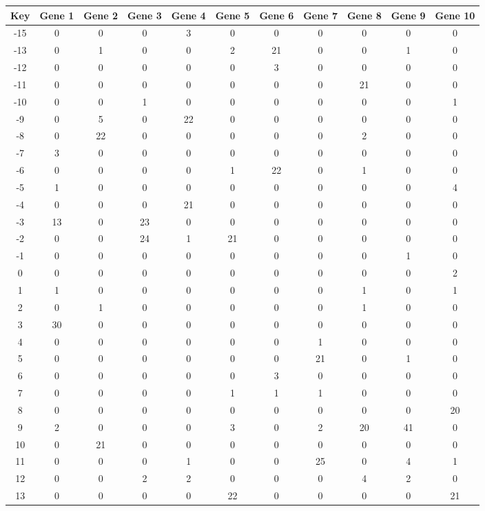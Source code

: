\begin{tabular}{|c|c|c|c|c|c|c|c|c|c|c|}
\hline
Key & Gene 1 & Gene 2 & Gene 3 & Gene 4 & Gene 5 & Gene 6 & Gene 7 & Gene 8 & Gene 9 & Gene 10 \\
\hline
-15 & 0 & 0 & 0 & 3 & 0 & 0 & 0 & 0 & 0 & 0 \\
-13 & 0 & 1 & 0 & 0 & 2 & 21 & 0 & 0 & 1 & 0 \\
-12 & 0 & 0 & 0 & 0 & 0 & 3 & 0 & 0 & 0 & 0 \\
-11 & 0 & 0 & 0 & 0 & 0 & 0 & 0 & 21 & 0 & 0 \\
-10 & 0 & 0 & 1 & 0 & 0 & 0 & 0 & 0 & 0 & 1 \\
-9 & 0 & 5 & 0 & 22 & 0 & 0 & 0 & 0 & 0 & 0 \\
-8 & 0 & 22 & 0 & 0 & 0 & 0 & 0 & 2 & 0 & 0 \\
-7 & 3 & 0 & 0 & 0 & 0 & 0 & 0 & 0 & 0 & 0 \\
-6 & 0 & 0 & 0 & 0 & 1 & 22 & 0 & 1 & 0 & 0 \\
-5 & 1 & 0 & 0 & 0 & 0 & 0 & 0 & 0 & 0 & 4 \\
-4 & 0 & 0 & 0 & 21 & 0 & 0 & 0 & 0 & 0 & 0 \\
-3 & 13 & 0 & 23 & 0 & 0 & 0 & 0 & 0 & 0 & 0 \\
-2 & 0 & 0 & 24 & 1 & 21 & 0 & 0 & 0 & 0 & 0 \\
-1 & 0 & 0 & 0 & 0 & 0 & 0 & 0 & 0 & 1 & 0 \\
0 & 0 & 0 & 0 & 0 & 0 & 0 & 0 & 0 & 0 & 2 \\
1 & 1 & 0 & 0 & 0 & 0 & 0 & 0 & 1 & 0 & 1 \\
2 & 0 & 1 & 0 & 0 & 0 & 0 & 0 & 1 & 0 & 0 \\
3 & 30 & 0 & 0 & 0 & 0 & 0 & 0 & 0 & 0 & 0 \\
4 & 0 & 0 & 0 & 0 & 0 & 0 & 1 & 0 & 0 & 0 \\
5 & 0 & 0 & 0 & 0 & 0 & 0 & 21 & 0 & 1 & 0 \\
6 & 0 & 0 & 0 & 0 & 0 & 3 & 0 & 0 & 0 & 0 \\
7 & 0 & 0 & 0 & 0 & 1 & 1 & 1 & 0 & 0 & 0 \\
8 & 0 & 0 & 0 & 0 & 0 & 0 & 0 & 0 & 0 & 20 \\
9 & 2 & 0 & 0 & 0 & 3 & 0 & 2 & 20 & 41 & 0 \\
10 & 0 & 21 & 0 & 0 & 0 & 0 & 0 & 0 & 0 & 0 \\
11 & 0 & 0 & 0 & 1 & 0 & 0 & 25 & 0 & 4 & 1 \\
12 & 0 & 0 & 2 & 2 & 0 & 0 & 0 & 4 & 2 & 0 \\
13 & 0 & 0 & 0 & 0 & 22 & 0 & 0 & 0 & 0 & 21 \\
\hline
\end{tabular}